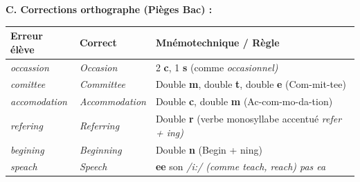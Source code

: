 \documentclass[11pt]{article}
\newcommand{\eng}[1]{\ifmmode\text{\textit{#1}}\else\begingroup\selectlanguage{english}\itshape #1\endgroup\fi}
\begin{document}
\begin{exoresolu}
\textbf{C. Corrections orthographe (Pièges Bac) :}
\begin{center}
\begin{tabular}{|l|l|l|}
\hline
\rowcolor{popredL} \textbf{Erreur élève} & \textbf{Correct} & \textbf{Mnémotechnique / Règle} \\ \hline
\eng{occassion} & \eng{Occasion} & 2 \textbf{c}, 1 \textbf{s} (comme \eng{occasionnel}) \\ \hline
\eng{comittee} & \eng{Committee} & Double \textbf{m}, double \textbf{t}, double \textbf{e} (Com-mit-tee) \\ \hline
\eng{accomodation} & \eng{Accommodation} & Double \textbf{c}, double \textbf{m} (Ac-com-mo-da-tion) \\ \hline
\eng{refering} & \eng{Referring} & Double \textbf{r} (verbe monosyllabe accentué \eng{refer} + \eng{ing}) \\ \hline
\eng{begining} & \eng{Beginning} & Double \textbf{n} (Begin + ning) \\ \hline
\eng{speach} & \eng{Speech} & \textbf{ee} son \eng{/i:/} (comme \eng{teach, reach}) pas \eng{ea} \\ \hline
\end{tabular}
\end{center}
\end{exoresolu}
\end{document}
